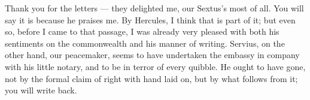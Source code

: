 

Thank you for the letters --- they delighted me, our Sextus's most of all. You will say it is because he praises me. By Hercules, I think that is part of it; but even so, before I came to that passage, I was already very pleased with both his sentiments on the commonwealth and his manner of writing. Servius, on the other hand, our peacemaker, seems to have undertaken the embassy in company with his little notary, and to be in terror of every quibble. He ought to have gone, not by the formal claim of right with hand laid on, but by what follows from it; you will write back.
